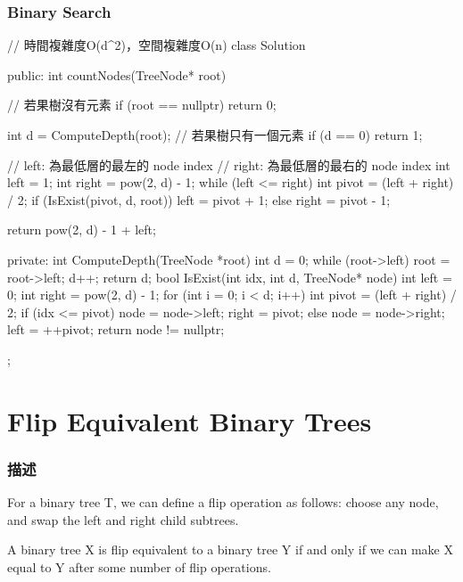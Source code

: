 \subsubsection{Binary Search}
\begin{Code}
// 時間複雜度O(d^2)，空間複雜度O(n)
class Solution {
public:
    int countNodes(TreeNode* root) {
        // 若果樹沒有元素
        if (root == nullptr) return 0;

        int d = ComputeDepth(root);
        // 若果樹只有一個元素
        if (d == 0) return 1;

        // left: 為最低層的最左的 node index
        // right: 為最低層的最右的 node index
        int left = 1; int right = pow(2, d) - 1;
        while (left <= right)
        {
            int pivot = (left + right) / 2;
            if (IsExist(pivot, d, root))
                left = pivot + 1;
            else
                right = pivot - 1;
        }

        return pow(2, d) - 1 + left;
    }
private:
    int ComputeDepth(TreeNode *root)
    {
        int d = 0;
        while (root->left)
        {
            root = root->left;
            d++;
        }
        return d;
    }
    bool IsExist(int idx, int d, TreeNode* node)
    {
        int left = 0; int right = pow(2, d) - 1;
        for (int i = 0; i < d; i++)
        {
            int pivot = (left + right) / 2;
            if (idx <= pivot)
            {
                node = node->left;
                right = pivot;
            }
            else
            {
                node = node->right;
                left = ++pivot;
            }
        }
        return node != nullptr;
    }
};
\end{Code}

\section{Flip Equivalent Binary Trees} %
\label{sec:flip-equivalent-binary-trees}


\subsubsection{描述}
For a binary tree T, we can define a flip operation as follows: choose any node, and swap the left and right child subtrees.

A binary tree X is flip equivalent to a binary tree Y if and only if we can make X equal to Y after some number of flip operations.

